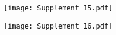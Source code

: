 \documentclass[12pt,a4paper]{article}
\begin{document}
 

\begin{figure}
%
\begin{minipage}{10cm}
\texttt{[image: Supplement\_15.pdf]}
\end{minipage}
%
\hfill
\begin{minipage}{10cm}
\texttt{[image: Supplement\_16.pdf]}
\end{minipage}

\end{figure}
\end{document}
